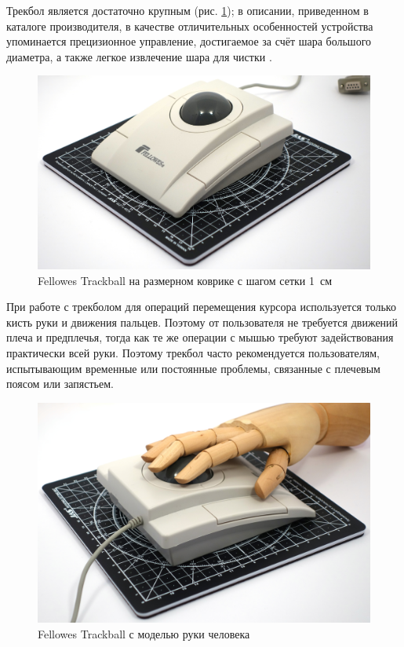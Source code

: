 \documentclass[11pt, a4paper]{article}
\begin{document}
Трекбол является достаточно крупным (рис. \ref{fig:FellowesTrackballSize}); в описании, приведенном в каталоге производителя, в качестве отличительных особенностей устройства упоминается прецизионное управление, достигаемое за счёт шара большого диаметра, а также легкое извлечение шара для чистки \cite{advertising}.

\begin{figure}[h]
    \centering
    \includegraphics[scale=0.3]{1995_fellowes_trackball/size_30.jpg}
    \caption{Fellowes Trackball на размерном коврике с шагом сетки 1~см}
    \label{fig:FellowesTrackballSize}
\end{figure}

При работе с трекболом для операций перемещения курсора используется только кисть руки и движения пальцев. Поэтому от пользователя не требуется движений плеча и предплечья, тогда как те же операции с мышью требуют задействования практически всей руки. Поэтому трекбол часто рекомендуется пользователям, испытывающим временные или постоянные проблемы, связанные с плечевым поясом или запястьем.

\begin{figure}[h]
    \centering
    \includegraphics[scale=0.3]{1995_fellowes_trackball/hand_30.jpg}
    \caption{Fellowes Trackball с моделью руки человека}
    \label{fig:FellowesTrackballHand}
\end{figure}
\end{document}
